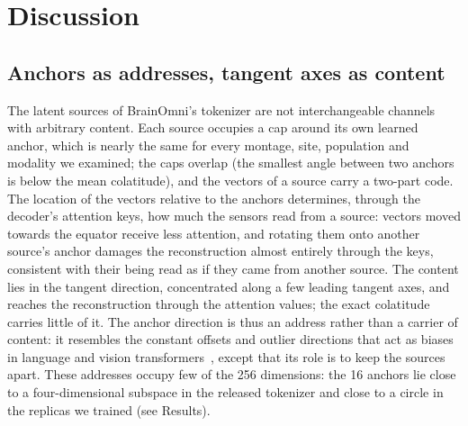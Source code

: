 \documentclass[10pt,letterpaper]{article}
\begin{document}


\FloatBarrier
\section*{Discussion}\label{sec:discussion}

\subsection*{Anchors as addresses, tangent axes as content}

The latent sources of BrainOmni's tokenizer are not interchangeable channels with arbitrary
content. Each source occupies a cap around its own learned anchor, which is nearly the same for
every montage, site, population and modality we examined; the caps overlap (the smallest angle
between two anchors is below the mean colatitude), and the vectors of a source carry a two-part
code. The location of the vectors relative to the anchors determines, through the decoder's
attention keys, how much the sensors read from a source: vectors moved towards the equator receive
less attention, and rotating them onto another source's anchor damages the reconstruction almost
entirely through the keys, consistent with their being read as if they came from another source.
The content lies in the tangent direction, concentrated along a few leading tangent axes, and
reaches the reconstruction through the attention values; the exact colatitude carries little of
it. The anchor direction is thus an address rather than a carrier of content: it resembles the
constant offsets and outlier directions that act as biases in language and vision transformers~\cite{bis2021toomuch,timkey2021rogue,sun2024massive,darcet2024registers}, except that its role is
to keep the sources apart. These addresses occupy few of the 256 dimensions: the 16 anchors lie close to a
four-dimensional subspace in the released tokenizer and close to a circle in the replicas we
trained (see Results).
\end{document}
